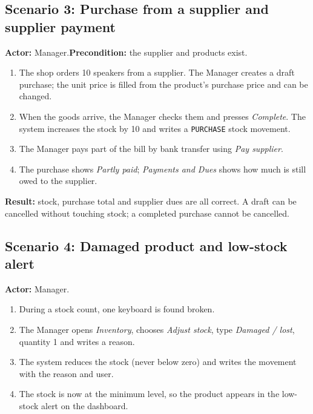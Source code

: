 \documentclass[11pt,a4paper]{article}
\newcommand{\code}[1]{\texttt{#1}}
\begin{document}
\subsection{Scenario 3: Purchase from a supplier and supplier payment}
\textbf{Actor:} Manager.\quad \textbf{Precondition:} the supplier and products exist.
\begin{enumerate}
  \item The shop orders 10 speakers from a supplier. The Manager creates a draft purchase;
        the unit price is filled from the product's purchase price and can be changed.
  \item When the goods arrive, the Manager checks them and presses \emph{Complete}.
        The system increases the stock by 10 and writes a \code{PURCHASE} stock movement.
  \item The Manager pays part of the bill by bank transfer using \emph{Pay supplier}.
  \item The purchase shows \emph{Partly paid}; \emph{Payments and Dues} shows how much is still owed to the supplier.
\end{enumerate}
\textbf{Result:} stock, purchase total and supplier dues are all correct. A draft can be cancelled
without touching stock; a completed purchase cannot be cancelled.

\subsection{Scenario 4: Damaged product and low-stock alert}
\textbf{Actor:} Manager.
\begin{enumerate}
  \item During a stock count, one keyboard is found broken.
  \item The Manager opens \emph{Inventory}, chooses \emph{Adjust stock}, type \emph{Damaged / lost},
        quantity 1 and writes a reason.
  \item The system reduces the stock (never below zero) and writes the movement with the reason and user.
  \item The stock is now at the minimum level, so the product appears in the low-stock alert on the dashboard.
\end{enumerate}
\end{document}

